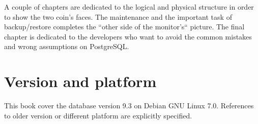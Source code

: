 \documentclass[oneside]{book}
\begin{document}
A couple of chapters are dedicated to the logical and physical structure in 
order to show the two coin's faces. The maintenance and the important task of 
backup/restore completes the ``other side of the monitor's`` picture.
The final chapter is dedicated to the developers who want to avoid the common 
mistakes and wrong assumptions on PostgreSQL.

\section*{Version and platform}
This book cover the database version 9.3 on Debian GNU Linux 7.0.
References to older version or different platform are explicitly specified.













\appendix

\listoffigures
\listoftables
\printindex{}
\end{document}
